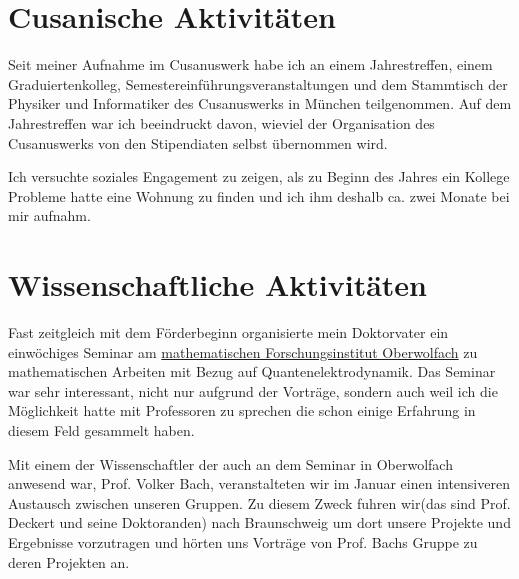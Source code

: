 \documentclass[a4paper,12pt]{article}
\begin{document}
\section{Cusanische Aktivitäten}

Seit meiner Aufnahme im Cusanuswerk habe ich an einem Jahrestreffen, einem Graduiertenkolleg, Semestereinführungsveranstaltungen und dem Stammtisch der Physiker und Informatiker des Cusanuswerks in München teilgenommen. Auf dem Jahrestreffen war ich beeindruckt davon, wieviel der Organisation des Cusanuswerks von den Stipendiaten selbst übernommen wird. 

Ich versuchte soziales Engagement zu zeigen, als zu Beginn des Jahres ein Kollege Probleme hatte eine Wohnung zu finden und ich ihm deshalb ca. zwei Monate bei mir aufnahm. 

\section{Wissenschaftliche Aktivitäten}

Fast zeitgleich mit dem Förderbeginn organisierte mein Doktorvater ein einwöchiges Seminar am  \href{https://www.mfo.de/}{mathematischen Forschungsinstitut Oberwolfach} zu mathematischen Arbeiten mit Bezug auf Quantenelektrodynamik. Das Seminar war sehr interessant, nicht nur aufgrund der Vorträge, sondern auch weil ich die Möglichkeit hatte mit Professoren zu sprechen die schon einige Erfahrung in diesem Feld gesammelt haben.

Mit einem der Wissenschaftler der auch an dem Seminar in Oberwolfach anwesend war, Prof. Volker Bach, veranstalteten wir im Januar einen intensiveren Austausch zwischen unseren Gruppen. Zu diesem Zweck fuhren wir(das sind Prof. Deckert und seine Doktoranden) nach Braunschweig um dort unsere Projekte und Ergebnisse vorzutragen und hörten uns Vorträge von Prof. Bachs Gruppe zu deren Projekten an. 
\end{document}

